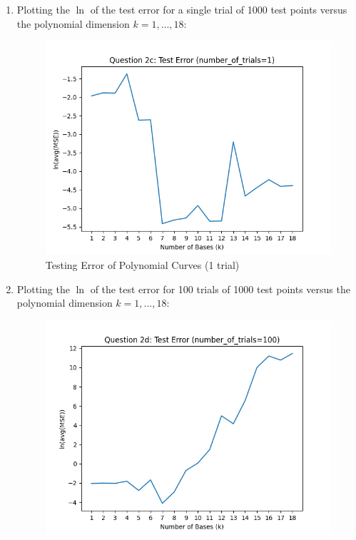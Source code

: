 \documentclass[12pt]{article}
\begin{document}
\begin{enumerate}[leftmargin=\labelsep]
\begin{enumerate}
        \item Plotting the $\ln$ of the test error for a single trial of 1000 test points versus the polynomial dimension $k = 1, . . . , 18$:
            \begin{figure}[h]
            \centering
            \includegraphics[scale=0.5]{outputs/python/q2/q2c}
            \caption{Testing Error of Polynomial Curves (1 trial)}
            \label{fig:2c}
            \end{figure}
\newpage
        \item Plotting the $\ln$ of the test error for 100 trials of 1000 test points versus the polynomial dimension $k = 1, . . . , 18$:
            \begin{figure}[h]
            \centering
            \includegraphics[scale=0.5]{outputs/python/q2/q2d}

\end{figure}
\end{enumerate}
\end{enumerate}
\end{document}
